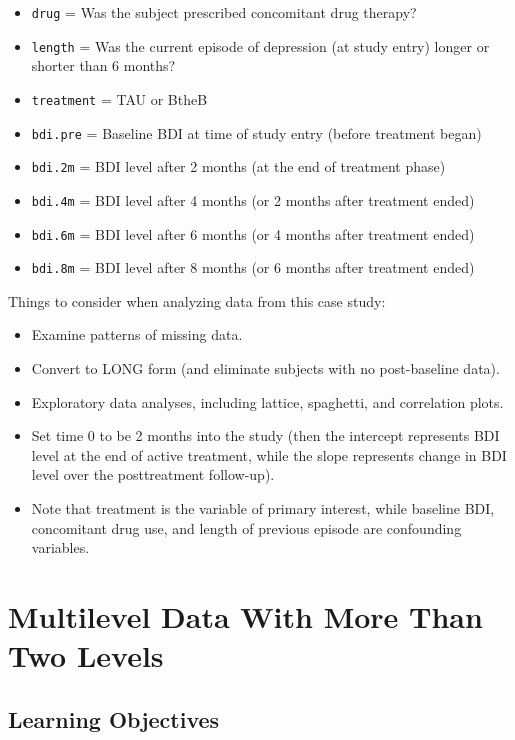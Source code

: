 \documentclass[
]{krantz}
\providecommand{\tightlist}{%
  \setlength{\itemsep}{0pt}\setlength{\parskip}{0pt}}
\begin{document}
\begin{enumerate}
  \begin{itemize}
  \tightlist
  \item
    \texttt{drug} = Was the subject prescribed concomitant drug therapy?
  \item
    \texttt{length} = Was the current episode of depression (at study entry) longer or shorter than 6 months?
  \item
    \texttt{treatment} = TAU or BtheB
  \item
    \texttt{bdi.pre} = Baseline BDI at time of study entry (before treatment began)
  \item
    \texttt{bdi.2m} = BDI level after 2 months (at the end of treatment phase)
  \item
    \texttt{bdi.4m} = BDI level after 4 months (or 2 months after treatment ended)
  \item
    \texttt{bdi.6m} = BDI level after 6 months (or 4 months after treatment ended)
  \item
    \texttt{bdi.8m} = BDI level after 8 months (or 6 months after treatment ended)
  \end{itemize}

  Things to consider when analyzing data from this case study:

  \begin{itemize}
  \tightlist
  \item
    Examine patterns of missing data.
  \item
    Convert to LONG form (and eliminate subjects with no post-baseline data).
  \item
    Exploratory data analyses, including lattice, spaghetti, and correlation plots.
  \item
    Set time 0 to be 2 months into the study (then the intercept represents BDI level at the end of active treatment, while the slope represents change in BDI level over the posttreatment follow-up).
  \item
    Note that treatment is the variable of primary interest, while baseline BDI, concomitant drug use, and length of previous episode are confounding variables.
  \end{itemize}
\end{enumerate}

\chapter{Multilevel Data With More Than Two Levels}\label{ch-3level}

\section{Learning Objectives}\label{learning-objectives-9}
\end{document}
